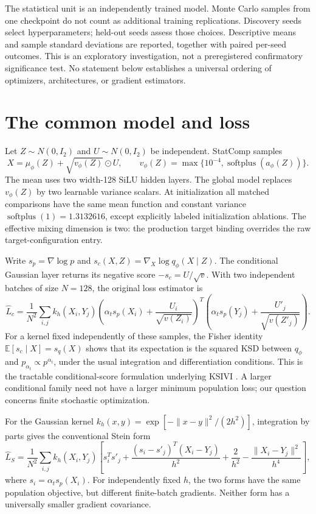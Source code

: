 \documentclass[11pt,a4paper]{article}
\newcommand{\E}{\mathbb E}
\begin{document}
The statistical unit is an independently trained model. Monte Carlo samples
from one checkpoint do not count as additional training replications. Discovery
seeds select hyperparameters; held-out seeds assess those choices. Descriptive
means and sample standard deviations are reported, together with paired
per-seed outcomes. This is an exploratory investigation, not a preregistered
confirmatory significance test. No statement below establishes a universal
ordering of optimizers, architectures, or gradient estimators.

\section{The common model and loss}
Let $Z\sim N(0,I_2)$ and $U\sim N(0,I_2)$ be independent. StatComp samples
\[
 X=\mu_\phi(Z)+\sqrt{v_\phi(Z)}\odot U,\qquad
 v_\phi(Z)=\max\{10^{-4},\operatorname{softplus}(a_\phi(Z))\}.
\]
The mean uses two width-128 SiLU hidden layers. The global model replaces
$v_\phi(Z)$ by two learnable variance scalars. At initialization all matched
comparisons have the same mean function and constant variance
$\operatorname{softplus}(1)=1.3132616$, except explicitly labeled initialization
ablations. The effective mixing dimension is two: the production target binding
overrides the raw target-configuration entry.

Write $s_p=\nabla\log p$ and $s_c(X,Z)=\nabla_X\log q_\phi(X\mid Z)$.
The conditional Gaussian layer returns its negative score
$-s_c=U/\sqrt v$. With two independent batches of size $N=128$, the original
loss estimator is
\begin{equation}
 \widehat L_c=\frac1{N^2}\sum_{i,j} k_h(X_i,Y_j)
 \left(\alpha_t s_p(X_i)+\frac{U_i}{\sqrt{v(Z_i)}}\right)^T
 \left(\alpha_t s_p(Y_j)+\frac{U'_j}{\sqrt{v(Z'_j)}}\right).
 \label{eq:original}
\end{equation}
For a kernel fixed independently of these samples, the Fisher identity
$\E[s_c\mid X]=s_q(X)$ shows that its expectation is the squared KSD between
$q_\phi$ and $p_{\alpha_t}\propto p^{\alpha_t}$, under the usual integration
and differentiation conditions. This is the tractable conditional-score
formulation underlying KSIVI \cite{ksivi}. A larger conditional family need
not have a larger minimum population loss; our question concerns finite
stochastic optimization.

For the Gaussian kernel $k_h(x,y)=\exp[-\|x-y\|^2/(2h^2)]$, integration by
parts gives the conventional Stein form
\begin{equation}
 \widehat L_S=\frac1{N^2}\sum_{i,j} k_h(X_i,Y_j)
 \left[s_i^Ts'_j+\frac{(s_i-s'_j)^T(X_i-Y_j)}{h^2}
 +\frac2{h^2}-\frac{\|X_i-Y_j\|^2}{h^4}\right],
 \label{eq:stein}
\end{equation}
where $s_i=\alpha_t s_p(X_i)$. For independently fixed $h$, the two forms
have the same population objective, but different finite-batch gradients.
Neither form has a universally smaller gradient covariance.
\end{document}
